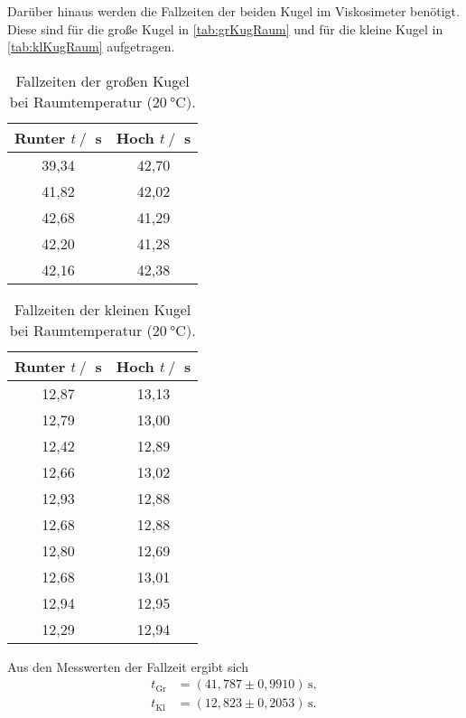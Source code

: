 Darüber hinaus werden die Fallzeiten der beiden Kugel im Viskosimeter benötigt. Diese sind für die große Kugel in \autoref{tab:grKugRaum} und für die kleine Kugel
in \autoref{tab:klKugRaum} aufgetragen.

\begin{table}[H]
  \centering
      \caption{Fallzeiten der großen Kugel bei Raumtemperatur ($\SI{20}{\celsius})$.}
      \label{tab:grKugRaum}
      \begin{tabular}{c c}
      \toprule
      Runter $t\:/\:$ s & Hoch $t\:/\:$ s\\
      \midrule
        39,34 & 42,70 \\
        41,82 & 42,02 \\
        42,68 & 41,29 \\
        42,20 & 41,28 \\
        42,16 & 42,38 \\
      \bottomrule
  \end{tabular}
\end{table}

\begin{table}[H]
  \centering
      \caption{Fallzeiten der kleinen Kugel bei Raumtemperatur ($\SI{20}{\celsius})$.}
      \label{tab:klKugRaum}
      \begin{tabular}{c c}
      \toprule
      Runter $t\:/\:$ s & Hoch $t\:/\:$ s\\
      \midrule
        12,87 & 13,13 \\
        12,79 & 13,00 \\
        12,42 & 12,89 \\
        12,66 & 13,02 \\
        12,93 & 12,88 \\
        12,68 & 12,88 \\
        12,80 & 12,69 \\
        12,68 & 13,01 \\
        12,94 & 12,95 \\
        12,29 & 12,94 \\
      \bottomrule
  \end{tabular}
\end{table}

Aus den Messwerten der Fallzeit ergibt sich
\begin{align*}
  t_{\text{Gr}} &= (41,787\pm 0,9910) \,\si{\second}, \\
  t_{\text{Kl}} &= (12,823\pm 0,2053) \,\si{\second}. \\
\end{align*}

